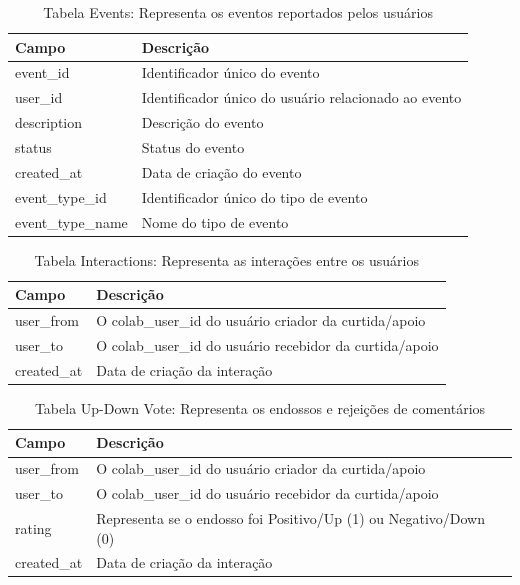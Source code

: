 \begin{table}[ht]
	\centering
	\caption{Tabela Events: Representa os eventos reportados pelos usuários}
	\label{tab:event_model}
	\begin{tabularx}{\textwidth}{|l|X|}
		\hline
		\textbf{Campo}    & \textbf{Descrição}                                   \\
		\hline
		event\_id         & Identificador único do evento                        \\
		user\_id          & Identificador único do usuário relacionado ao evento \\
		description       & Descrição do evento                                  \\
		status            & Status do evento                                     \\
		created\_at       & Data de criação do evento                            \\
		event\_type\_id   & Identificador único do tipo de evento                \\
		event\_type\_name & Nome do tipo de evento                               \\
		\hline
	\end{tabularx}
\end{table}

\begin{table}[ht]
	\centering
	\caption{Tabela Interactions: Representa as interações entre os usuários}
	\label{tab:interactions_model}
	\begin{tabularx}{\textwidth}{|l|X|}
		\hline
		\textbf{Campo}    & \textbf{Descrição}                                   		 		\\
		\hline
		user\_from        & O colab\_user\_id do usuário criador da curtida/apoio          		\\
		user\_to          & O colab\_user\_id do usuário recebidor da curtida/apoio  		 	\\
		created\_at       & Data de criação da interação        				 				\\
		\hline
	\end{tabularx}
\end{table}

\begin{table}[ht]
	\centering
	\caption{Tabela Up-Down Vote: Representa os endossos e rejeições de comentários}
	\label{tab:updown_model}
	\begin{tabularx}{\textwidth}{|l|X|}
		\hline
		\textbf{Campo}    & \textbf{Descrição}                                   		 		\\
		\hline
		user\_from        & O colab\_user\_id do usuário criador da curtida/apoio          		\\
		user\_to          & O colab\_user\_id do usuário recebidor da curtida/apoio  		 	\\
		rating            & Representa se o endosso foi Positivo/Up (1) ou Negativo/Down (0)  	\\
		created\_at       & Data de criação da interação           				 				\\
		\hline
	\end{tabularx}
\end{table}

